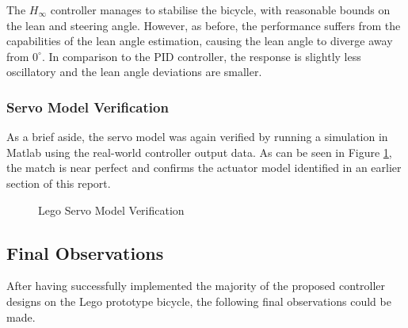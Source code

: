 The $H_{\infty}$ controller manages to stabilise the bicycle, with reasonable bounds on the lean and steering angle. However, as before, the performance suffers from the capabilities of the lean angle estimation, causing the lean angle to diverge away from $0^{\circ}$. In comparison to the PID controller, the response is slightly less oscillatory and the lean angle deviations are smaller.

\subsubsection{Servo Model Verification}
As a brief aside, the servo model was again verified by running a simulation in Matlab using the real-world controller output data. As can be seen in Figure \ref{fig:LegoServoIDPart2}, the match is near perfect and confirms the actuator model identified in an earlier section of this report. \\

\begin{figure}[H]
\centering
{}
	\caption{Lego Servo Model Verification}
	\label{fig:LegoServoIDPart2}
\end{figure}

\subsection{Final Observations}
After having successfully implemented the majority of the proposed controller designs on the Lego prototype bicycle, the following final observations could be made.

